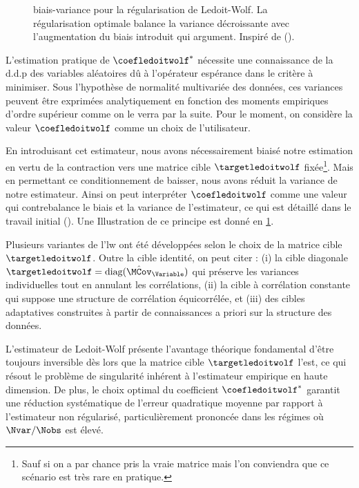 \begin{figure}
  
  \caption{biais-variance pour la régularisation de Ledoit-Wolf. La régularisation optimale balance la variance décroissante avec l'augmentation du biais introduit qui argument. Inspiré de (\cite{LedoitWolf2004}).}
  \label{fig:context-estimation-lwfbiasvar}

\end{figure}


L'estimation pratique de $\coefledoitwolf^*$ nécessite une connaissance de la d.d.p des variables aléatoires dû à l'opérateur espérance dans le critère à minimiser. Sous l'hypothèse de normalité multivariée des données, ces variances peuvent être exprimées analytiquement en fonction des moments empiriques d'ordre supérieur comme on le verra par la suite. Pour le moment, on considère la valeur $\coefledoitwolf$ comme un choix de l'utilisateur.

En introduisant cet estimateur, nous avons nécessairement biaisé notre estimation en vertu de la contraction vers une matrice cible $\targetledoitwolf$ fixée\footnote{Sauf si on a par chance pris la vraie matrice mais l'on conviendra que ce scénario est très rare en pratique.}. Mais en permettant ce conditionnement de baisser, nous avons réduit la variance de notre estimateur. Ainsi on peut interpréter $\coefledoitwolf$ comme une valeur qui contrebalance le biais et la variance de l'estimateur, ce qui est détaillé dans le travail initial (\cite{LedoitWolf2004}). Une Illustration de ce principe est donné en \cref{fig:context-estimation-lwfbiasvar}.




\begin{remark}
Plusieurs variantes de l'lw ont été développées selon le choix de la matrice cible $\targetledoitwolf$. Outre la cible identité, on peut citer : (i) la cible diagonale $\targetledoitwolf = \text{diag}(\hat{\MCov}_\Variable)$ qui préserve les variances individuelles tout en annulant les corrélations, (ii) la cible à corrélation constante qui suppose une structure de corrélation équicorrélée, et (iii) des cibles adaptatives construites à partir de connaissances a priori sur la structure des données.
\end{remark}


L'estimateur de Ledoit-Wolf présente l'avantage théorique fondamental d'être toujours inversible dès lors que la matrice cible $\targetledoitwolf$ l'est, ce qui résout le problème de singularité inhérent à l'estimateur empirique en haute dimension. De plus, le choix optimal du coefficient $\coefledoitwolf^*$ garantit une réduction systématique de l'erreur quadratique moyenne par rapport à l'estimateur non régularisé, particulièrement prononcée dans les régimes où $\Nvar/\Nobs$ est élevé.

